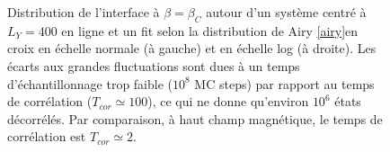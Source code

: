 \begin{figure}[h]
\begin{minipage}[t]{0.5\linewidth}
	\end{minipage}
	\caption{ Distribution de l'interface à $\beta = \beta_C$ autour d'un système centré à $L_Y=400$ en ligne et un fit selon la distribution de Airy \ref{airy}\protect\footnotemark en croix en échelle normale (à gauche) et en échelle log (à droite). Les écarts aux grandes fluctuations sont dues à un temps d’échantillonnage trop faible ($10^8$ MC steps) par rapport au temps de corrélation ($T_{cor} \simeq 100$), ce qui ne donne qu'environ $10^6$ états décorrélés. Par comparaison, à haut champ magnétique, le temps de corrélation est $T_{cor} \simeq 2$.  }
	\label{histo_airy}
\end{figure}


